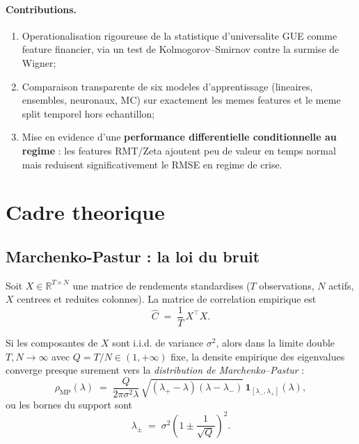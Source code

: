 \documentclass[11pt,a4paper]{article}
\begin{document}
\paragraph{Contributions.}
\begin{enumerate}[label=(\roman*), leftmargin=*]
  \item Operationalisation rigoureuse de la statistique d'universalite GUE comme feature financier, via un test de Kolmogorov--Smirnov contre la surmise de Wigner;
  \item Comparaison transparente de six modeles d'apprentissage (lineaires, ensembles, neuronaux, MC) sur exactement les memes features et le meme split temporel hors echantillon;
  \item Mise en evidence d'une \textbf{performance differentielle conditionnelle au regime} : les features RMT/Zeta ajoutent peu de valeur en temps normal mais reduisent significativement le RMSE en regime de crise.
\end{enumerate}

\section{Cadre theorique}
\label{sec:framework}

\subsection{Marchenko-Pastur : la loi du bruit}

Soit $X \in \mathbb{R}^{T \times N}$ une matrice de rendements standardises ($T$ observations, $N$ actifs, $X$ centrees et reduites colonnes). La matrice de correlation empirique est
\begin{equation}
\widehat{C} \;=\; \frac{1}{T}\, X^{\top} X.
\label{eq:Chat}
\end{equation}

Si les composantes de $X$ sont i.i.d. de variance $\sigma^2$, alors dans la limite double $T, N \to \infty$ avec $Q = T/N \in (1, +\infty)$ fixe, la densite empirique des eigenvalues converge presque surement vers la \emph{distribution de Marchenko--Pastur} \citep{Marchenko1967} :
\begin{equation}
\rho_{\mathrm{MP}}(\lambda) \;=\; \frac{Q}{2\pi\sigma^2 \lambda}\,
\sqrt{(\lambda_+ - \lambda)(\lambda - \lambda_-)}\,
\mathbf{1}_{[\lambda_-,\lambda_+]}(\lambda),
\label{eq:MPpdf}
\end{equation}
ou les bornes du support sont
\begin{equation}
\lambda_\pm \;=\; \sigma^2 \left(1 \pm \frac{1}{\sqrt{Q}}\right)^2.
\label{eq:MPbounds}
\end{equation}
\end{document}
